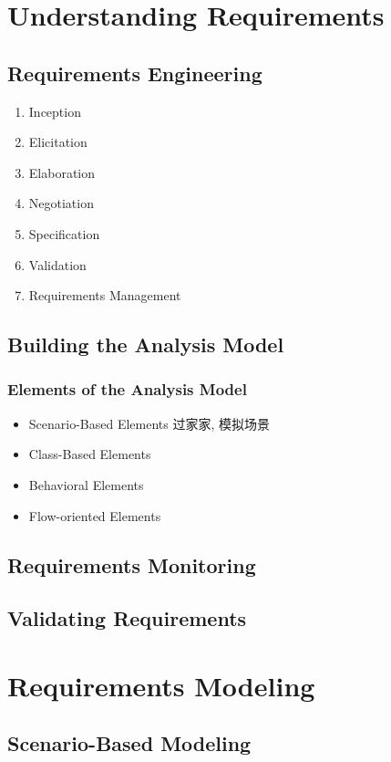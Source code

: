 \newpage
\section{Understanding Requirements}
\subsection{Requirements Engineering}
\begin{enumerate}
    \item Inception
    \item Elicitation
    \item Elaboration
    \item Negotiation
    \item Specification
    \item Validation
    \item Requirements Management
\end{enumerate}

\subsection{Building the Analysis Model}
\subsubsection{Elements of the Analysis Model}
\begin{itemize}
    \item Scenario-Based Elements
    \subitem 过家家, 模拟场景
    \item Class-Based Elements
    \item Behavioral Elements
    \item Flow-oriented Elements
\end{itemize}

\subsection{Requirements Monitoring}

\subsection{Validating Requirements}

\section{Requirements Modeling}

\subsection{Scenario-Based Modeling}
